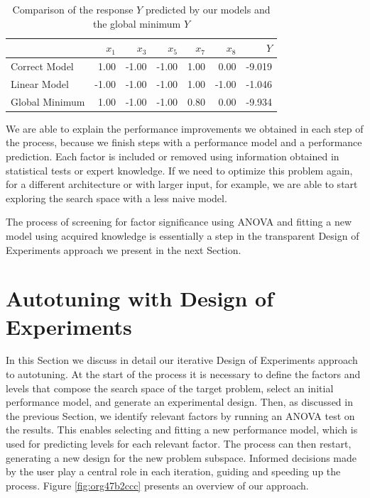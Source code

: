 \documentclass[conference]{IEEEtran}
\begin{document}
\begin{table}[ht]
\centering
\caption{Comparison of the response $Y$ predicted by our models and the global minimum $Y$}
\label{tab:prediction_comparisons}
\begingroup\footnotesize
\begin{tabular}{lrrrrrr}
  \toprule
 & $x_1$ & $x_3$ & $x_5$ & $x_7$ & $x_8$ & $Y$ \\
  \midrule
Correct Model & 1.00 & -1.00 & -1.00 & 1.00 & 0.00 & -9.019 \\
  Linear Model & -1.00 & -1.00 & -1.00 & 1.00 & -1.00 & -1.046 \\
  Global Minimum & 1.00 & -1.00 & -1.00 & 0.80 & 0.00 & -9.934 \\
   \bottomrule
\end{tabular}
\endgroup
\end{table}

We are able to explain the performance improvements we obtained in each step of
the process, because we finish steps with a performance model and a performance
prediction. Each factor is included or removed using information obtained in
statistical tests or expert knowledge. If we need to optimize this problem
again, for a different architecture or with larger input, for example, we are
able to start exploring the search space with a less naive model.

The process of screening for factor significance using ANOVA and fitting a
new model using acquired knowledge is essentially a step in the transparent
Design of Experiments approach we present in the next Section.
\section{Autotuning with Design of Experiments}
\label{sec:orgabdb142}
In this Section we discuss in detail our iterative Design of Experiments
approach to autotuning. At the start of the process it is necessary to define
the factors and levels that compose the search space of the target problem,
select an initial performance model, and generate an experimental design. Then,
as discussed in the previous Section, we identify relevant factors by running an
ANOVA test on the results. This enables selecting and fitting a new performance
model, which is used for predicting levels for each relevant factor. The process
can then restart, generating a new design for the new problem subspace. Informed
decisions made by the user play a central role in each iteration, guiding and
speeding up the process. Figure \ref{fig:org47b2ccc} presents an overview of
our approach.
\end{document}
